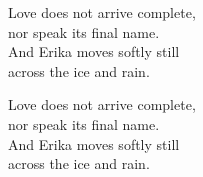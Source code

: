 \begin{lyrics}
Love does not arrive complete,\\
nor speak its final name.\\
And Erika moves softly still\\
across the ice and rain.


Love does not arrive complete,\\
nor speak its final name.\\
And Erika moves softly still\\
across the ice and rain.


\end{lyrics}

